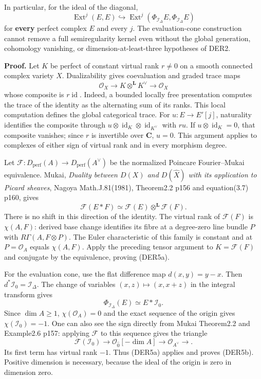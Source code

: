 \documentclass[11pt,a4paper]{article}
\theoremstyle{definition}
\begin{document}
In particular, for the ideal of the diagonal, \[
 \operatorname{Ext}^j(E,E)\hookrightarrow
 \operatorname{Ext}^j(\Phi_{\mathcal I_\Delta}E,
                         \Phi_{\mathcal I_\Delta}E)
\tag{DER5b}
\] for \textbf{every} perfect complex \(E\) and every \(j\). The
evaluation-cone construction cannot remove a full semiregularity kernel
even without the global generation, cohomology vanishing, or
dimension-at-least-three hypotheses of DER2.

\textbf{Proof.} Let \(K\) be perfect of constant virtual rank \(r\ne0\)
on a smooth connected complex variety \(X\). Dualizability gives
coevaluation and graded trace maps \[
 \mathcal O_X\longrightarrow K\otimes^{\mathbf L}K^\vee
 \longrightarrow\mathcal O_X
\] whose composite is \(r\operatorname{id}\). Indeed, a bounded locally
free presentation computes the trace of the identity as the alternating
sum of its ranks. This local computation defines the global categorical
trace. For \(u:E\to E'[j]\), naturality identifies the composite through
\(u\otimes\operatorname{id}_K\otimes\operatorname{id}_{K^\vee}\) with
\(ru\). If \(u\otimes\operatorname{id}_K=0\), that composite vanishes;
since \(r\) is invertible over \(\mathbf C\), \(u=0\). This argument
applies to complexes of either sign of virtual rank and in every
morphism degree.

Let \(\mathcal F:D_{\mathrm{perf}}(A)\to D_{\mathrm{perf}}(A^\vee)\) be
the normalized Poincare Fourier--Mukai equivalence. Mukai, \emph{Duality
between \(D(X)\) and \(D(\widehat X)\) with its application to Picard
sheaves}, Nagoya Math.J.81(1981), Theorem2.2 p156 and equation(3.7)
p160, gives \[
 \mathcal F(E*F)\simeq
 \mathcal F(E)\otimes^{\mathbf L}\mathcal F(F).
\tag{DER5c}
\] There is no shift in this direction of the identity. The virtual rank
of \(\mathcal F(F)\) is \(\chi(A,F)\): derived base change identifies
its fibre at a degree-zero line bundle \(P\) with
\(R\Gamma(A,F\otimes P)\). The Euler characteristic of this family is
constant and at \(P=\mathcal O_A\) equals \(\chi(A,F)\). Apply the
preceding tensor argument to \(K=\mathcal F(F)\) and conjugate by the
equivalence, proving (DER5a).

For the evaluation cone, use the flat difference map \(d(x,y)=y-x\).
Then \(d^*\mathcal I_0=\mathcal I_\Delta\). The change of variables
\((x,z)\mapsto(x,x+z)\) in the integral transform gives \[
 \Phi_{\mathcal I_\Delta}(E)\simeq E*\mathcal I_0.
\] Since \(\dim A\ge1\), \(\chi(\mathcal O_A)=0\) and the exact sequence
of the origin gives \(\chi(\mathcal I_0)=-1\). One can also see the sign
directly from Mukai Theorem2.2 and Example2.6 p157: applying
\(\mathcal F\) to this sequence gives the triangle \[
 \mathcal F(\mathcal I_0)\longrightarrow
 \mathcal O_{\widehat0}[-\dim A]\longrightarrow
 \mathcal O_{A^\vee}\longrightarrow.
\] Its first term has virtual rank \(-1\). Thus (DER5a) applies and
proves (DER5b). Positive dimension is necessary, because the ideal of
the origin is zero in dimension zero.
\end{document}
